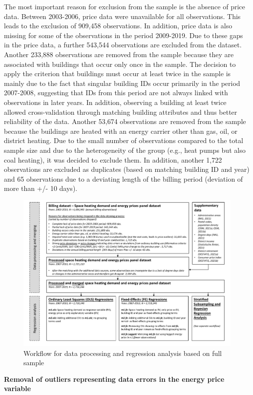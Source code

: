 \documentclass[12pt,twoside]{reedthesis}
\begin{document}
The most important reason for exclusion from the sample is the absence of price data. Between 2003-2006, price data were unavailable for all observations. This leads to the exclusion of 909,458 observations. In addition, price data is also missing for some of the observations in the period 2009-2019. Due to these gaps in the price data, a further 543,544 observations are excluded from the dataset. Another 233,888 observations are removed from the sample because they are associated with buildings that occur only once in the sample. The decision to apply the criterion that buildings must occur at least twice in the sample is mainly due to the fact that singular building IDs occur primarily in the period 2007-2008, suggesting that IDs from this period are not always linked with observations in later years. In addition, observing a building at least twice allowed cross-validation through matching building attributes and thus better reliability of the data. Another 53,674 observations are removed from the sample because the buildings are heated with an energy carrier other than gas, oil, or district heating. Due to the small number of observations compared to the total sample size and due to the heterogeneity of the group (e.g., heat pumps but also coal heating), it was decided to exclude them. In addition, another 1,722 observations are excluded as duplicates (based on matching building ID and year) and 65 observations due to a deviating length of the billing period (deviation of more than +/- 10 days).
\begin{figure}

{\centering \includegraphics[width=1.03\linewidth]{figure/workflow_diagramm_part1} 

}

\caption{Workflow for data processing and regression analysis based on full sample}\label{fig:workflow1}
\end{figure}
\textbf{Removal of outliers representing data errors in the energy price variable}
\end{document}
